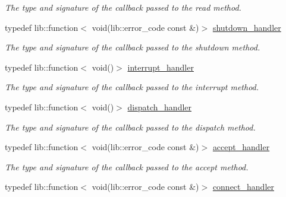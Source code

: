 \begin{DoxyCompactItemize}
\begin{DoxyCompactList}\small\item\em The type and signature of the callback passed to the read method. \end{DoxyCompactList}\item 
typedef lib\+::function$<$ void(lib\+::error\+\_\+code const \&)$>$ \hyperlink{namespacewebsocketpp_1_1transport_af39aff6fc4cb76f7df0d5322b734d156}{shutdown\+\_\+handler}\hypertarget{namespacewebsocketpp_1_1transport_af39aff6fc4cb76f7df0d5322b734d156}{}\label{namespacewebsocketpp_1_1transport_af39aff6fc4cb76f7df0d5322b734d156}

\begin{DoxyCompactList}\small\item\em The type and signature of the callback passed to the shutdown method. \end{DoxyCompactList}\item 
typedef lib\+::function$<$ void()$>$ \hyperlink{namespacewebsocketpp_1_1transport_a8090563b066d7e8e31f7165be18dee51}{interrupt\+\_\+handler}\hypertarget{namespacewebsocketpp_1_1transport_a8090563b066d7e8e31f7165be18dee51}{}\label{namespacewebsocketpp_1_1transport_a8090563b066d7e8e31f7165be18dee51}

\begin{DoxyCompactList}\small\item\em The type and signature of the callback passed to the interrupt method. \end{DoxyCompactList}\item 
typedef lib\+::function$<$ void()$>$ \hyperlink{namespacewebsocketpp_1_1transport_a6658447b2e10f4c712dd792aad0e0c78}{dispatch\+\_\+handler}\hypertarget{namespacewebsocketpp_1_1transport_a6658447b2e10f4c712dd792aad0e0c78}{}\label{namespacewebsocketpp_1_1transport_a6658447b2e10f4c712dd792aad0e0c78}

\begin{DoxyCompactList}\small\item\em The type and signature of the callback passed to the dispatch method. \end{DoxyCompactList}\item 
typedef lib\+::function$<$ void(lib\+::error\+\_\+code const \&)$>$ \hyperlink{namespacewebsocketpp_1_1transport_a9326ea831379368ee47841b2e46cb009}{accept\+\_\+handler}\hypertarget{namespacewebsocketpp_1_1transport_a9326ea831379368ee47841b2e46cb009}{}\label{namespacewebsocketpp_1_1transport_a9326ea831379368ee47841b2e46cb009}

\begin{DoxyCompactList}\small\item\em The type and signature of the callback passed to the accept method. \end{DoxyCompactList}\item 
typedef lib\+::function$<$ void(lib\+::error\+\_\+code const \&)$>$ \hyperlink{namespacewebsocketpp_1_1transport_ac392fca34e946b48414278c0c3addfa5}{connect\+\_\+handler}\hypertarget{namespacewebsocketpp_1_1transport_ac392fca34e946b48414278c0c3addfa5}{}\label{namespacewebsocketpp_1_1transport_ac392fca34e946b48414278c0c3addfa5}


\end{DoxyCompactItemize}
